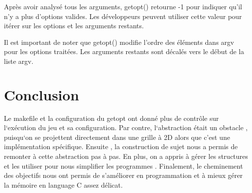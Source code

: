 \documentclass[a4paper]{article}
\begin{document}
Après avoir analysé tous les arguments, getopt() retourne -1 pour indiquer qu'il n'y a plus d'options valides. Les développeurs peuvent utiliser cette valeur pour itérer sur les options et les arguments restants.

Il est important de noter que getopt() modifie l'ordre des éléments dans argv pour les options traitées. Les arguments restants sont décalés vers le début de la liste argv.


\section{Conclusion}
Le makefile et la configuration du getopt ont donné plus de contrôle sur l`exécution du jeu et sa configuration. Par contre, l`abstraction était un obstacle ,
puisqu`on se projettent directement dans une grille à 2D alors que c'est une implémentation spécifique. Ensuite , la construction de sujet 
nous a permis de remonter à cette abstraction pas à pas. En plus, on a appris à gérer les structures et les utiliser pour nous simplifier les programmes . Finalement, le cheminement 
des objectifs nous ont permis de s'améliorer en programmation et à mieux gérer la mémoire en language C assez délicat.  
\end{document}
